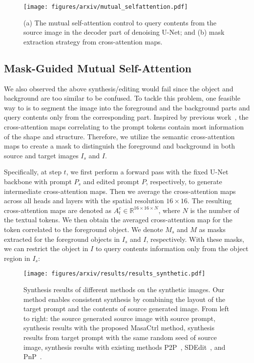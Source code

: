 \documentclass[10pt,twocolumn,letterpaper]{article}
\begin{document}
\begin{figure}[t]
    \centering
    \texttt{[image: figures/arxiv/mutual\_selfattention.pdf]}
    \caption{(a) The mutual self-attention control to query contents from the source image in the decoder part of denoising U-Net; and (b) mask extraction strategy from cross-attention maps.}
    \label{fig:mutual_selfattention}
\end{figure}

\subsection{Mask-Guided Mutual Self-Attention} \label{sec:mask-guided}
We also observed the above synthesis/editing would fail since the object and background are too similar to be confused. 
To tackle this problem, one feasible way to is to segment the image into the foreground and the background parts and query contents only from the corresponding part. 
Inspired by previous work~\cite{hertz2022prompt, tang2022daam}, the cross-attention maps correlating to the prompt tokens contain most information of the shape and structure. 
Therefore, we utilize the semantic cross-attention maps to create a mask to distinguish the foreground and background in both source and target images $I_s$ and $I$. 

Specifically, at step $t$, we first perform a forward pass with the fixed U-Net backbone with prompt $P_s$ and edited prompt $P$, respectively, to generate intermediate cross-attention maps.
Then we average the cross-attention maps across all heads and layers with the spatial resolution $16 \times 16$. The resulting cross-attention maps are denoted as ${A^c_t} \in \mathbb{R}^{16\times 16 \times N}$, where $N$ is the number of the textual tokens. 
We then obtain the averaged cross-attention map for the token correlated to the foreground object. We denote $M_s$ and $M$ as masks extracted for the foreground objects in $I_s$ and $I$, respectively. With these masks, we can restrict the object in $I$ to query contents information only from the object region in $I_s$:

\begin{figure*}[!t]
    \centering
    \texttt{[image: figures/arxiv/results/results\_synthetic.pdf]}
    \caption{Synthesis results of different methods on the synthetic images. Our method enables consistent synthesis by combining the layout of the target prompt and the contents of source generated image. From left to right: the source generated source image with source prompt, synthesis results with the proposed MasaCtrl method, synthesis results from target prompt with the same random seed of source image, synthesis results with existing methods    P2P~\cite{hertz2022prompt}, SDEdit~\cite{meng2021sdedit}, and PnP~\cite{tumanyan2022plug}. }
    \label{fig:results_synthetic}
\end{figure*}
\end{document}
